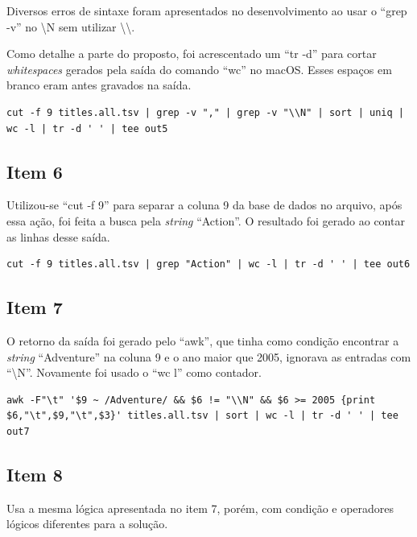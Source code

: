 \documentclass[12pt]{article}
\begin{document}
Diversos erros de  sintaxe foram apresentados no desenvolvimento ao usar o ``grep -v'' no \textbackslash N sem utilizar \textbackslash\textbackslash .

Como detalhe a parte do proposto, foi acrescentado um ``tr -d'' para cortar \textit{whitespaces} gerados pela saída do comando ``wc'' no macOS. Esses espaços em branco eram antes gravados na saída. 

\begin{verbatim}
cut -f 9 titles.all.tsv | grep -v "," | grep -v "\\N" | sort | uniq | wc -l | tr -d ' ' | tee out5 
\end{verbatim}

\subsection*{Item 6}

Utilizou-se ``cut -f 9'' para separar a coluna 9 da base de dados no arquivo, após essa ação, foi feita a busca pela \textit{string}  ``Action''. O resultado foi gerado ao contar as linhas desse saída.

\begin{verbatim}
cut -f 9 titles.all.tsv | grep "Action" | wc -l | tr -d ' ' | tee out6
\end{verbatim}

\subsection*{Item 7}

O retorno da saída foi gerado pelo ``awk'', que tinha como condição encontrar a \textit{string} ``Adventure'' na coluna 9 e o ano maior que 2005, ignorava as entradas com ``\textbackslash N''. Novamente foi usado o ``wc l'' como contador.

\begin{verbatim}
awk -F"\t" '$9 ~ /Adventure/ && $6 != "\\N" && $6 >= 2005 {print $6,"\t",$9,"\t",$3}' titles.all.tsv | sort | wc -l | tr -d ' ' | tee out7
\end{verbatim}

\subsection*{Item 8}

Usa a mesma lógica apresentada no item 7, porém, com condição e operadores lógicos diferentes para a solução.
\end{document}
